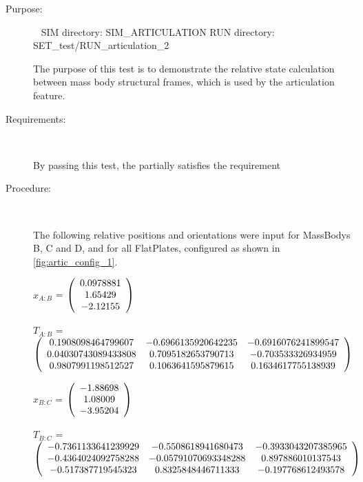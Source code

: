 \begin{description}

\item[Purpose:] \ \newline
SIM directory: SIM\_ARTICULATION
RUN directory: SET\_test/RUN\_articulation\_2

The purpose of this test is to demonstrate the relative state calculation
between mass body structural frames, which is used by the articulation
feature.

\item[Requirements:] \ \newline

By passing this test, the \ModelDesc partially satisfies
the requirement 

\item[Procedure:] \ \newline

The following relative positions and orientations were input for MassBodys
B, C and D, and for all FlatPlates, configured as shown in
\ref{fig:artic_config_1}.

$x_{A:B}$ = $\left( \begin{array} {ccc}  0.0978881 \\    1.65429 \\   -2.12155
\end{array} \right)\\ \\$

$T_{A:B}$ = $\left( \begin{array} {ccc} 
   0.1908098464799607 & -0.6966135920642235 & -0.6916076241899547 \\ 
   0.04030743089433808 & 0.7095182653790713 & -0.703533326934959 \\ 
   0.9807991198512527 & 0.1063641595879615 & 0.1634617755138939 \\
\end{array} \right)\\ \\$

$x_{B:C}$ = $\left( \begin{array} {ccc}   -1.88698 \\    1.08009 \\   -3.95204
\end{array} \right)\\ \\$

$T_{B:C}$ = $\left( \begin{array} {ccc} 
   -0.7361133641239929 & -0.5508618941680473 & -0.3933043207385965 \\ 
   -0.4364024092758288 & -0.05791070693348288 & 0.897886010137543 \\ 
   -0.517387719545323 & 0.8325848446711333 & -0.197768612493578 \\
\end{array} \right)\\ \\$


\end{description}
